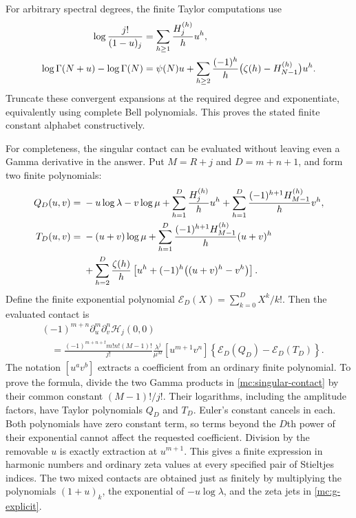 \documentclass[11pt,a4paper]{article}
\numberwithin{equation}{section}
\theoremstyle{definition}
\theoremstyle{remark}
\begin{document}
For arbitrary spectral degrees, the finite Taylor computations use
\begin{align}\label{mc:harmonic-jets}
 \log\frac{j!}{(1-u)_j}&=\sum_{h\ge1}\frac{H_j^{(h)}}h u^h,\notag\\
 \log\Gamma(N+u)-\log\Gamma(N)
 &=\psi(N)u+
       \sum_{h\ge2}\frac{(-1)^h}{h}
                 \bigl(\zeta(h)-H_{N-1}^{(h)}\bigr)u^h.
\end{align}
Truncate these convergent expansions at the required degree and
exponentiate, equivalently using complete Bell polynomials.
This proves the stated finite constant alphabet constructively.

For completeness, the singular contact can be evaluated without
leaving even a Gamma derivative in the answer. Put $M=R+j$ and
$D=m+n+1$, and form two finite polynomials:
\begin{align}\label{mc:finite-logarithms}
 Q_D(u,v)={}&-u\log\lambda-v\log\mu
       +\sum_{h=1}^D\frac{H_j^{(h)}}h u^h
       +\sum_{h=1}^D\frac{(-1)^{h+1}H_{M-1}^{(h)}}h v^h,
       \notag\\
 T_D(u,v)={}&-(u+v)\log\mu
       +\sum_{h=1}^D\frac{(-1)^{h+1}H_{M-1}^{(h)}}h(u+v)^h
       \notag\\
 &+\sum_{h=2}^D\frac{\zeta(h)}h
          \left[u^h+(-1)^h\bigl((u+v)^h-v^h\bigr)\right].
\end{align}
Define the finite exponential polynomial
$\mathcal E_D(X)=\sum_{k=0}^D X^k/k!$.
Then the evaluated contact is
\begin{equation}\label{mc:finite-jet}
\begin{split}
 &(-1)^{m+n}\partial_u^m\partial_v^n\mathcal H_j(0,0)\\
 &\quad=
 \frac{(-1)^{m+n+t}m!n!(M-1)!}{j!}
     \frac{\lambda^j}{\mu^M}
 [u^{m+1}v^n]\left\{\mathcal E_D(Q_D)-\mathcal E_D(T_D)\right\}.
\end{split}
\end{equation}
The notation $[u^av^b]$ extracts a coefficient from an ordinary
finite polynomial. To prove the formula, divide the two Gamma products
in \eqref{mc:singular-contact} by their common constant $(M-1)!/j!$.
Their logarithms, including the amplitude factors, have Taylor
polynomials $Q_D$ and $T_D$. Euler's constant cancels in each.
Both polynomials have zero constant term, so terms beyond the $D$th
power of their exponential cannot affect the requested coefficient.
Division by the removable $u$ is exactly extraction at $u^{m+1}$.
This gives a finite expression in harmonic numbers and ordinary zeta
values at every specified pair of Stieltjes indices. The two mixed
contacts are obtained just as finitely by multiplying the polynomials
$(1+u)_k$, the exponential of $-u\log\lambda$, and the zeta jets
in \eqref{mc:g-explicit}.
\end{document}
